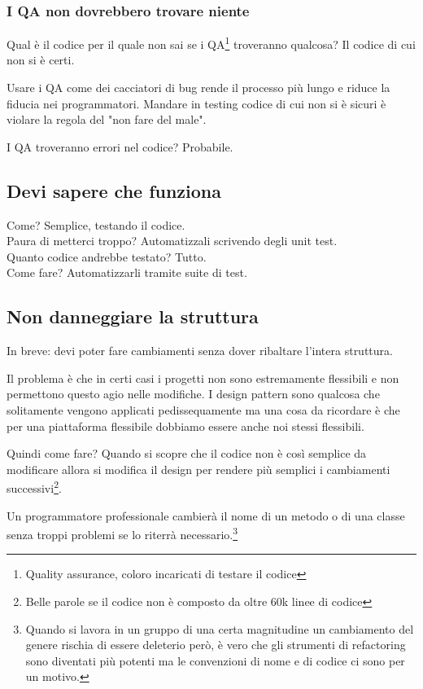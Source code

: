 \documentclass[11pt,a4paper]{book}
\begin{document}
\subsubsection{I QA non dovrebbero trovare niente}
Qual è il codice per il quale non sai se i QA\footnote{Quality assurance, coloro incaricati di testare il codice} troveranno qualcosa? Il codice di cui non si è certi.

Usare i QA come dei cacciatori di bug rende il processo più lungo e riduce la fiducia nei programmatori. Mandare in testing codice di cui non si è sicuri è violare la regola del "non fare del male".

I QA troveranno errori nel codice? Probabile.

\subsection{Devi sapere che funziona}
Come? Semplice, testando il codice.\\
Paura di metterci troppo? Automatizzali scrivendo degli unit test.\\
Quanto codice andrebbe testato? Tutto.\\
Come fare? Automatizzarli tramite suite di test.

\subsection{Non danneggiare la struttura}
In breve: devi poter fare cambiamenti senza dover ribaltare l'intera struttura.

Il problema è che in certi casi i progetti non sono estremamente flessibili e non permettono questo agio nelle modifiche. I design pattern sono qualcosa che solitamente vengono applicati pedissequamente ma una cosa da ricordare è che per una piattaforma flessibile dobbiamo essere anche noi stessi flessibili.

Quindi come fare? Quando si scopre che il codice non è così semplice da modificare allora si modifica il design per rendere più semplici i cambiamenti successivi\footnote{Belle parole se il codice non è composto da oltre 60k linee di codice}.

Un programmatore professionale cambierà il nome di un metodo o di una classe senza troppi problemi se lo riterrà necessario.\footnote{Quando si lavora in un gruppo di una certa magnitudine un cambiamento del genere rischia di essere deleterio però, è vero che gli strumenti di refactoring sono diventati più potenti ma le convenzioni di nome e di codice ci sono per un motivo.}
\end{document}
